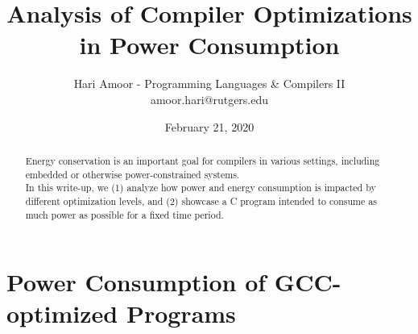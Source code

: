 \documentclass[12pt, twocolumn]{article}
\begin{document}
\title{Analysis of Compiler Optimizations in Power Consumption}
\author{%
Hari Amoor - Programming Languages \& Compilers II\\
{\ttfamily\normalsize amoor.hari@rutgers.edu}\\
} %
\date{February 21, 2020}


\maketitle

\begin{abstract}

  Energy conservation is an important goal for compilers in various settings, including embedded or otherwise power-constrained systems. \\
  \newline
  In this write-up, we (1) analyze how power and energy consumption is impacted by different optimization levels, and (2) showcase a C program intended to consume as much power as possible for a fixed time period.
  
\end{abstract}

\section{Power Consumption of GCC-optimized Programs}


\end{document}
